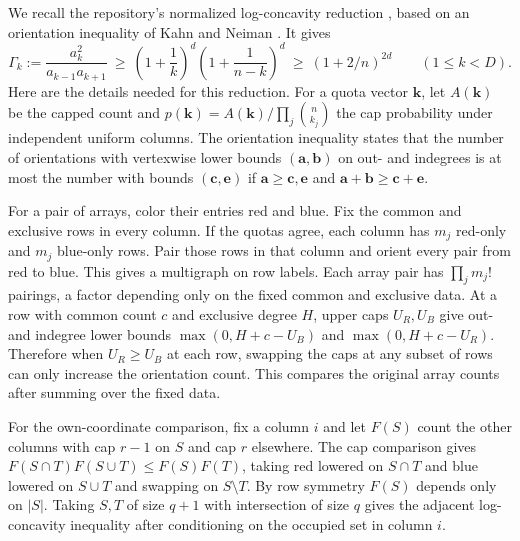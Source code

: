 \documentclass[11pt]{article}
\begin{document}
We recall the repository's normalized log-concavity reduction
\cite{Orient}, based on an orientation inequality of Kahn and
Neiman \cite[Lemma~8]{KN}. It gives
\begin{equation}\label{eq:gamma}
\Gamma_k:=\frac{a_k^2}{a_{k-1}a_{k+1}}
\ \ge\ \left(1+\frac1k\right)^d
          \left(1+\frac1{n-k}\right)^d
\ \ge\ (1+2/n)^{2d}\qquad(1\le k<D).
\end{equation}
Here are the details needed for this reduction. For a quota vector
$\mathbf{k}$, let $A(\mathbf{k})$ be the capped count and
$p(\mathbf{k})=A(\mathbf{k})/\prod_j\binom n{k_j}$ the cap probability
under independent uniform columns. The orientation inequality states
that the number of orientations with vertexwise lower bounds
$(\mathbf a,\mathbf b)$ on out- and indegrees is at most the number with
bounds $(\mathbf c,\mathbf e)$ if
$\mathbf a\ge\mathbf c,\mathbf e$ and
$\mathbf a+\mathbf b\ge\mathbf c+\mathbf e$.

For a pair of arrays, color their entries red and blue. Fix the common
and exclusive rows in every column. If the quotas agree, each column
has $m_j$ red-only and $m_j$ blue-only rows. Pair those rows in that
column and orient every pair from red to blue. This gives a multigraph
on row labels. Each array pair has $\prod_j m_j!$ pairings, a factor
depending only on the fixed common and exclusive data. At a row with
common count $c$ and exclusive degree $H$, upper caps $U_R,U_B$ give
out- and indegree lower bounds $\max(0,H+c-U_B)$ and
$\max(0,H+c-U_R)$. Therefore when $U_R\ge U_B$ at each row, swapping
the caps at any subset of rows can only increase the orientation
count. This compares the original array counts after summing over the
fixed data.

For the own-coordinate comparison, fix a column $i$ and let $F(S)$
count the other columns with cap $r-1$ on $S$ and cap $r$ elsewhere.
The cap comparison gives
$F(S\cap T)F(S\cup T)\le F(S)F(T)$, taking red lowered on $S\cap T$
and blue lowered on $S\cup T$ and swapping on $S\setminus T$.
By row symmetry $F(S)$ depends only on $|S|$. Taking $S,T$ of size
$q+1$ with intersection of size $q$ gives the adjacent log-concavity
inequality after conditioning on the occupied set in column $i$.
\end{document}
